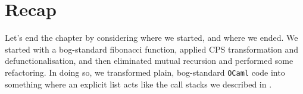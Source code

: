 \section{Recap}
Let's end the chapter by considering where we started, and where we ended. We started with a bog-standard fibonacci function, applied CPS transformation and defunctionalisation, and then eliminated mutual recursion and performed some refactoring. In doing so, we transformed plain, bog-standard \texttt{OCaml} code into something where an explicit list acts like the call stacks we described in .